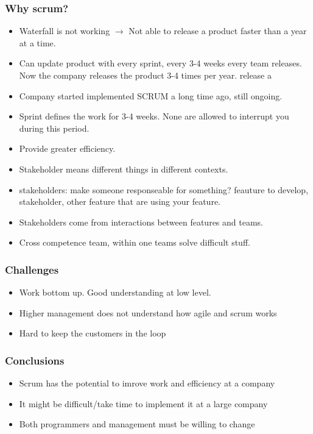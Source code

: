 \documentclass{beamer}
\begin{document}
\begin{frame}
  \frametitle{Why scrum?}
  \begin{itemize}

  \item Waterfall is not working $\rightarrow$ Not able to release a
    product faster than a year at a time.
  \item Can update product with every sprint, every 3-4 weeks every
    team releases. Now the company releases the product 3-4 times per year.
    release a
  \item Company started implemented SCRUM a long time ago, still
    ongoing.
  \item Sprint defines the work for 3-4 weeks. None are allowed to
    interrupt you during this period.
  \item Provide greater efficiency.
  \item Stakeholder means different things in different contexts.
  \item stakeholders: make someone responseable for something?
    feauture to develop, stakeholder, other feature that are using
    your feature.
  \item Stakeholders come from interactions between features and teams.
  \item Cross competence team, within one teams solve difficult stuff.

  \end{itemize}
\end{frame}

\begin{frame}
  \frametitle{Challenges}
  \begin{itemize}
  \item Work bottom up. Good understanding at low level. 
  \item Higher management does not understand how agile and scrum works
  \item Hard to keep the customers in the loop
  \end{itemize}
\end{frame}

\begin{frame}
  \frametitle{Conclusions}
  \begin{itemize}
  \item Scrum has the potential to imrove work and efficiency at a company
  \item It might be difficult/take time to implement it at a large company
  \item Both programmers and management must be willing to change
  \end{itemize}
\end{frame}
\end{document}

